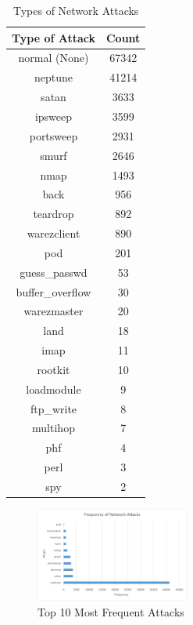\documentclass[conference]{IEEEtran}
\begin{document}
\begin{table}[htbp]
\caption{Types of Network Attacks}
\begin{center}
\begin{tabular}{|c|c|}
\hline
Type of Attack & Count \\
\hline
normal (None)	&	67342	\\
neptune	&	41214	\\
satan	&	3633	\\
ipsweep	&	3599	\\
portsweep	&	2931	\\
smurf	&	2646	\\
nmap	&	1493	\\
back	&	956	\\
teardrop	&	892	\\
warezclient	&	890	\\
pod	&	201	\\
guess\_passwd	&	53	\\
buffer\_overflow	&	30	\\
warezmaster	&	20	\\
land	&	18	\\
imap	&	11	\\
rootkit	&	10	\\
loadmodule	&	9	\\
ftp\_write	&	8	\\
multihop	&	7	\\
phf	&	4	\\
perl	&	3	\\
spy	&	2	\\
\hline
\end{tabular}
\label{tab1}
\end{center}
\end{table}

\begin{figure}[htbp]
\centerline{\includegraphics[height= 170 pt, width=0.45\textwidth]{External/Fig-Frequency-of-Attacks.PNG}}
\caption{Top 10 Most Frequent Attacks}
\label{fig1}
\end{figure}
\end{document}
